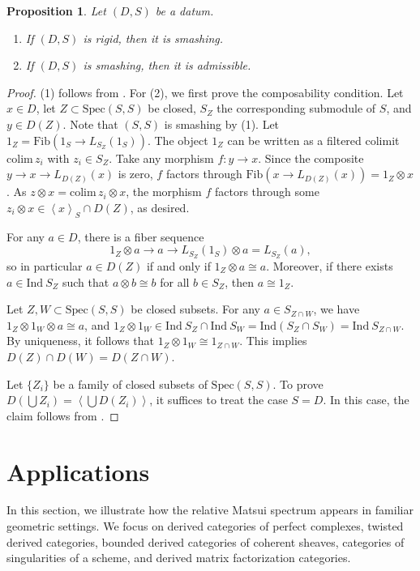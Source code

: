\documentclass[11pt]{amsart}
\theoremstyle{definition}
\theoremstyle{plain}
\newtheorem{prop}[defn]{Proposition}
\theoremstyle{remark}
\newcommand{\Ind}{\mathrm{Ind}}
\newcommand{\Spec}{\mathrm{Spec}}
\newcommand{\ang}[1]{{\left\langle{#1}\right\rangle}}
\newcommand{\Fib}{\mathrm{Fib}}
\numberwithin{equation}{section}
\begin{document}
\begin{prop}
Let \((D,S)\) be a datum.
\begin{enumerate}
\item If \((D,S)\) is rigid, then it is smashing.
\item If \((D,S)\) is smashing, then it is admissible.
\end{enumerate}
\end{prop}
\begin{proof}
(1) follows from \cite[Proposition~9]{Miller1992finite}.
For (2), we first prove the composability condition.
Let \(x\in D\), let \(Z\subset \Spec(S,S)\) be closed, \(S_Z\) the corresponding submodule of \(S\), and \(y\in D(Z)\).
Note that \((S,S)\) is smashing by (1).
Let \(1_Z=\Fib(1_S\to L_{S_Z}(1_S))\).
The object \(1_Z\) can be written as a filtered colimit \(\mathrm{colim}\, z_i\) with \(z_i\in S_Z\).
Take any morphism \(f:y\to x\).
Since the composite \(y\to x\to L_{D(Z)}(x)\) is zero, \(f\) factors through \(\Fib(x\to L_{D(Z)}(x))=1_Z\otimes x\).
As \(z\otimes x=\mathrm{colim}\, z_i\otimes x\), the morphism \(f\) factors through some \(z_i\otimes x\in\ang{x}_{S}\cap D(Z)\), as desired.

For any \(a\in D\), there is a fiber sequence
\[
1_Z\otimes a\to a\to L_{S_Z}(1_S)\otimes a=L_{S_Z}(a),
\]
so in particular \(a\in D(Z)\) if and only if \(1_Z\otimes a\cong a\).
Moreover, if there exists \(a\in \Ind~ S_Z\) such that \(a\otimes b\cong b\) for all \(b\in S_Z\), then \(a\cong 1_Z\).

Let \(Z,W\subset \Spec(S,S)\) be closed subsets.
For any \(a\in S_{Z\cap W}\), we have \(1_Z\otimes 1_W\otimes a\cong a\), and \(1_Z\otimes 1_W\in \Ind ~S_Z\cap \Ind~ S_W=\Ind (S_Z\cap S_W)=\Ind ~ S_{Z\cap W}\).
By uniqueness, it follows that \(1_Z\otimes 1_W\cong 1_{Z\cap W}\).
This implies \(D(Z)\cap D(W)=D(Z\cap W)\).

Let \(\{Z_i\}\) be a family of closed subsets of \(\Spec(S,S)\).
To prove \(D(\bigcup Z_i)=\ang{\bigcup D(Z_i)}\), it suffices to treat the case \(S=D\).
In this case, the claim follows from \cite[Theorem~4.10]{Ba}.
\end{proof}



\section{Applications}\label{section:applications}
In this section, we illustrate how the relative Matsui spectrum appears in familiar geometric settings. 
We focus on derived categories of perfect complexes, twisted derived categories, bounded derived categories of coherent sheaves, categories of singularities of a scheme, and derived matrix factorization categories.  
\end{document}
